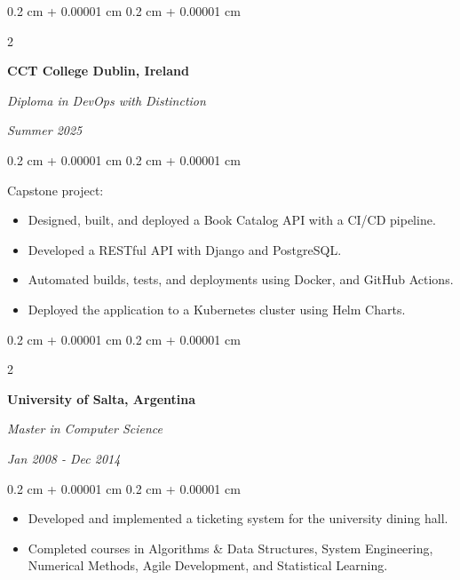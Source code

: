 \documentclass[10pt, letterpaper]{article}
\newenvironment{highlights}{
    \begin{itemize}[
        topsep=0.10 cm,
        parsep=0.10 cm,
        partopsep=0pt,
        itemsep=0pt,
        leftmargin=0.4 cm + 10pt
    ]
}{
    \end{itemize}
} %
\newenvironment{onecolentry}{
    \begin{adjustwidth}{
        0.2 cm + 0.00001 cm
    }{
        0.2 cm + 0.00001 cm
    }
}{
    \end{adjustwidth}
} %
\newenvironment{twocolentry}[2][]{
    \onecolentry
    \def\secondColumn{#2}
    \setcolumnwidth{\fill, 4.5 cm}
    \begin{paracol}{2}
}{
    \switchcolumn \raggedleft \secondColumn
    \end{paracol}
    \endonecolentry
} %
\begin{document}
        \vspace{0.2 cm}


        \begin{twocolentry}{
        \textit{Summer 2025}}
            \textbf{CCT College Dublin, Ireland}

            \textit{Diploma in DevOps with Distinction}
        \end{twocolentry}

        \vspace{0.10 cm}
        \begin{onecolentry}
        Capstone project:
            \begin{highlights}
                \item Designed, built, and deployed a Book Catalog API with a CI/CD pipeline.
                \item Developed a RESTful API with Django and PostgreSQL.
                \item Automated builds, tests, and deployments using Docker, and GitHub Actions.
                \item Deployed the application to a Kubernetes cluster using Helm Charts.
            \end{highlights}
        \end{onecolentry}

        \vspace{0.2 cm}


        \begin{twocolentry}{
        \textit{Jan 2008 - Dec 2014}}
            \textbf{University of Salta, Argentina}

            \textit{Master in Computer Science}
        \end{twocolentry}

        \vspace{0.10 cm}
        \begin{onecolentry}
            \begin{highlights}
                \item Developed and implemented a ticketing system for the university dining hall.
                \item Completed courses in Algorithms \& Data Structures, System Engineering, Numerical Methods, Agile Development, and Statistical Learning.
            \end{highlights}
        \end{onecolentry}


    
\end{document}
